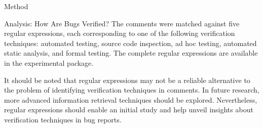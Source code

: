 \begin{section}{Method}
\begin{subsection}{Analysis: How Are Bugs Verified?}
	The comments were matched against five regular expressions, each corresponding to one of the following verification techniques: automated testing, source code inspection, ad hoc testing, automated static analysis, and formal testing. The complete regular expressions are available in the experimental package.

	It should be noted that regular expressions may not be a reliable alternative to the problem of identifying verification techniques in comments. In future research, more advanced information retrieval techniques should be explored. Nevertheless, regular expressions should enable an initial study and help unveil insights about verification techniques in bug reports.
	
	
	
	

\end{subsection}
\end{section}
